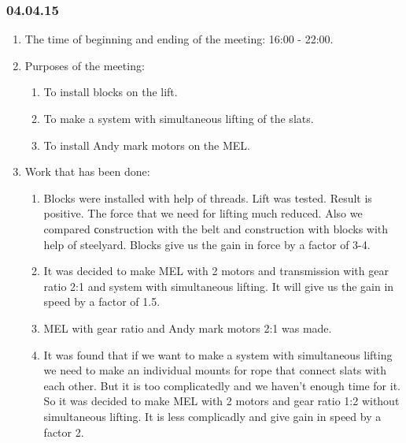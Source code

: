 \subsubsection{04.04.15}
\begin{enumerate}
	
	\item The time of beginning and ending of the meeting: 16:00 - 22:00.
	
	\item Purposes of the meeting: 
	\begin{enumerate}
		
		\item To install blocks on the lift.
		
		\item To make a system with simultaneous lifting of the slats.
		
        \item To install Andy mark motors on the MEL.
		
	\end{enumerate}

	\item Work that has been done:
	\begin{enumerate}
		
		\item Blocks were installed with help of threads. Lift was tested. Result is positive. The force that we need for lifting much reduced. Also we compared сonstruction with the belt and construction with blocks with help of steelyard. Blocks give us the gain in force by a factor of 3-4.   
		
		\item It was decided to make MEL with 2 motors and transmission with gear ratio 2:1 and system with simultaneous lifting. It will give us the gain in speed by a factor of 1.5.
		
		\item MEL with gear ratio and Andy mark motors 2:1 was made.
		
        \item It was found that if we want to make a system with simultaneous lifting we need to make an individual mounts for rope that connect slats with each other. But it is too complicatedly and we haven't enough time for it. So it was decided to make MEL with 2 motors and gear ratio 1:2 without simultaneous lifting. It is less complicadly and give gain in speed by a factor 2. 

	\end{enumerate}
	

\end{enumerate}
